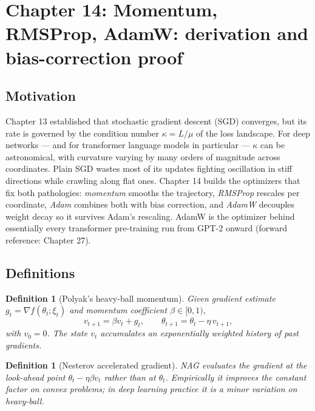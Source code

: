 \documentclass[11pt]{article}
\newtheorem{definition}[theorem]{Definition}
\theoremstyle{remark}
\begin{document}

\section*{Chapter 14: Momentum, RMSProp, AdamW: derivation and bias-correction proof}

\subsection*{Motivation}

Chapter 13 established that stochastic gradient descent (SGD) converges, but its rate is governed by the condition number $\kappa = L/\mu$ of the loss landscape. For deep networks --- and for transformer language models in particular --- $\kappa$ can be astronomical, with curvature varying by many orders of magnitude across coordinates. Plain SGD wastes most of its updates fighting oscillation in stiff directions while crawling along flat ones. Chapter 14 builds the optimizers that fix both pathologies: \emph{momentum} smooths the trajectory, \emph{RMSProp} rescales per coordinate, \emph{Adam} combines both with bias correction, and \emph{AdamW} decouples weight decay so it survives Adam's rescaling. AdamW is the optimizer behind essentially every transformer pre-training run from GPT-2 onward (forward reference: Chapter 27).

\subsection*{Definitions}

\begin{definition}[Polyak's heavy-ball momentum]
Given gradient estimate $g_t = \nabla f(\theta_t; \xi_t)$ and momentum coefficient $\beta \in [0,1)$,
\[
v_{t+1} = \beta v_t + g_t, \qquad \theta_{t+1} = \theta_t - \eta\, v_{t+1},
\]
with $v_0 = 0$. The state $v_t$ accumulates an exponentially weighted history of past gradients.
\end{definition}

\begin{definition}[Nesterov accelerated gradient]
NAG evaluates the gradient at the look-ahead point $\theta_t - \eta\beta v_t$ rather than at $\theta_t$. Empirically it improves the constant factor on convex problems; in deep learning practice it is a minor variation on heavy-ball.
\end{definition}
\end{document}
